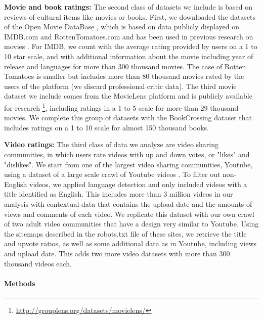 \documentclass[letterpaper]{sig-alternate-2013}
\begin{document}
\textbf{Movie and book ratings:}  The second class of datasets we include is
based on reviews of cultural items like movies or books. First, we downloaded
the datasets of the Open Movie DataBase \cite{Fritz2015}, which is based on
data publicly displayed on IMDB.com and RottenTomatoes.com and  has been used
in previous research on movies \cite{Garcia2014}. For IMDB, we count with the
average rating provided by users on a 1 to 10 star scale, and with additional
information about the movie including year of release and languages for more
than 300 thousand movies. The case of Rotten Tomatoes is smaller but includes
more than 80 thousand movies rated by the users of the platform (we discard
professional critic data).  The third movie dataset we include comes from the
MovieLens platform and is publicly available for research
\footnote{\url{http://grouplens.org/datasets/movielens/}}, including ratings in a 1
to 5 scale for more than 29 thousand movies. We complete this group of
datasets with the BookCrossing dataset \cite{Ziegler2005} that includes
ratings on a 1 to 10 scale for almost 150 thousand books.

\textbf{Video ratings:} The third class of data we analyze are video sharing
communities, in which users rate videos with up and down votes, or "likes" and
"dislikes". We start from one of the largest video sharing communities,
Youtube, using a dataset of a large scale crawl of Youtube videos
\cite{Abisheva2014}. To filter out non-English videos, we applied language
detection \cite{Danilak2015} and only included videos with a title identified
as English. This includes more than 3 million videos in our analysis with
contextual data that contains the upload date and the amounts of views and
comments of each video. We replicate this dataset with our own crawl of two
adult video communities that have a design very similar to Youtube. Using the
sitemaps described in the robots.txt file of these sites, we retrieve the
title and upvote ratios, as well as some additional data as in Youtube,
including views and upload date. This adds two more video datasets with more
than 300 thousand videos each.


\paragraph{Methods}
\end{document}
